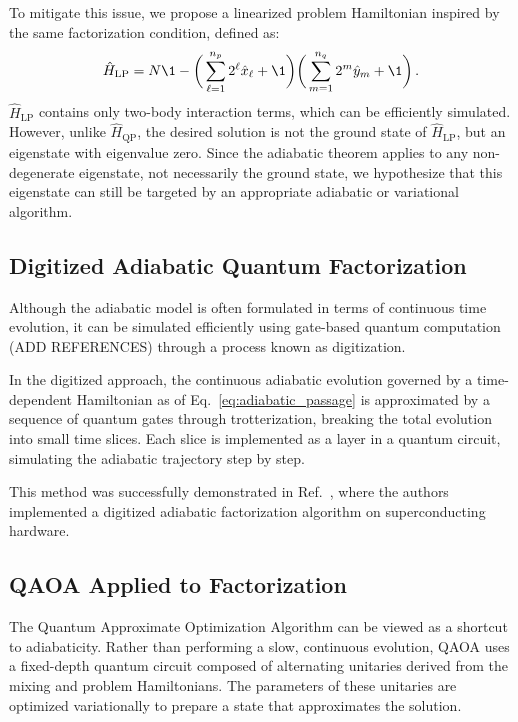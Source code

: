 To mitigate this issue, we propose a linearized problem Hamiltonian
inspired by the same factorization condition, defined as:
\begin{equation}
	\hat{H}_\mathrm{LP} = N \1 - \bigg( \sum_{\ell=1}^{n_p} 2^\ell \hat{x}_\ell + \1 \bigg)
	\bigg( \sum_{m=1}^{n_q} 2^m \hat{y}_m + \1 \bigg)\,.
	\label{eq:linear_problem_hamiltonian}
\end{equation}
$\hat{H}_\mathrm{LP}$ contains only two-body interaction terms, which can be efficiently
simulated. However, unlike $\hat{H}_\mathrm{QP}$, the desired solution is not the ground state of $\hat{H}_\mathrm{LP}$,
but an eigenstate with eigenvalue zero. Since the adiabatic theorem applies to any non-degenerate
eigenstate, not necessarily the ground state, we hypothesize that this eigenstate can still be
targeted by an appropriate adiabatic or variational algorithm.

\subsection{Digitized Adiabatic Quantum Factorization}
Although the adiabatic model is often formulated in terms of continuous time evolution, it
can be simulated efficiently using gate-based quantum computation {\color{red} (ADD REFERENCES)}
through a process known as digitization.

In the digitized approach, the continuous adiabatic evolution governed by a time-dependent
Hamiltonian as of Eq.~\ref{eq:adiabatic_passage} is approximated by a sequence of quantum
gates through trotterization, breaking the total evolution into small time slices. Each slice
is implemented as a layer in a quantum circuit, simulating the adiabatic trajectory step
by step.

This method was successfully demonstrated in Ref.~\cite{hegade_digitized_2021}, where
the authors implemented a digitized adiabatic factorization algorithm on superconducting
hardware.

\subsection{QAOA Applied to Factorization}
The Quantum Approximate Optimization Algorithm can be viewed as a shortcut to adiabaticity.
Rather than performing a slow, continuous evolution, QAOA uses a fixed-depth quantum
circuit composed of alternating unitaries derived from the mixing and problem Hamiltonians.
The parameters of these unitaries are optimized variationally to prepare a state that
approximates the solution.

